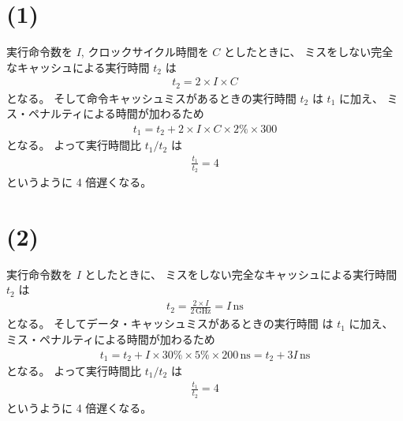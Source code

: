 \documentclass[11pt,dvipdfmx,a4paper]{jsarticle}
\begin{document}
\section*{(1)}
実行命令数を \(I\), クロックサイクル時間を \(C\) としたときに、
ミスをしない完全なキャッシュによる実行時間 \(t_2\) は
\begin{align*}
    t_2 = 2 \times I \times C
\end{align*}
となる。
そして命令キャッシュミスがあるときの実行時間 \(t_2\) は \(t_1\) に加え、
ミス・ペナルティによる時間が加わるため
\begin{align*}
    t_1 = t_2 + 2 \times I \times C \times 2\% \times 300
\end{align*}
となる。
よって実行時間比 \(t_1/t_2\) は
\begin{align*}
    \frac{t_1}{t_2} = 4
\end{align*}
というように 4 倍遅くなる。

\section*{(2)}
実行命令数を \(I\) としたときに、
ミスをしない完全なキャッシュによる実行時間 \(t_2\) は
\begin{align*}
    t_2 = \frac{2 \times I}{2\,\text{GHz}} = I \,\text{ns}
\end{align*}
となる。
そしてデータ・キャッシュミスがあるときの実行時間 は \(t_1\) に加え、
ミス・ペナルティによる時間が加わるため
\begin{align*}
    t_1 = t_2 + I \times 30 \% \times 5 \% \times 200\,\text{ns}
        = t_2 + 3I\,\text{ns}
\end{align*}
となる。
よって実行時間比 \(t_1/t_2\) は
\begin{align*}
    \frac{t_1}{t_2} = 4
\end{align*}
というように 4 倍遅くなる。
\end{document}
